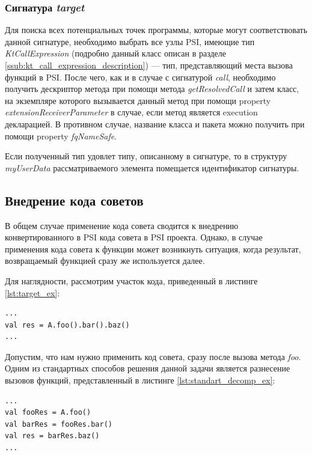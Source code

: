 \subsubsection{Сигнатура \textit{target}}
\label{ssub:target_signature}
Для поиска всех потенциальных точек программы, которые могут соответствовать
данной сигнатуре, необходимо выбрать все узлы PSI, имеющие тип
\textit{KtCallExpression} (подробно данный класс описан в разделе
\ref{ssub:kt_call_expression_description}) --- тип, представляющий места вызова
функций в PSI.
После чего, как и в случае с сигнатурой \textit{call}, необходимо получить
дескриптор метода при помощи метода \textit{getResolvedCall} и затем класс, на
экземпляре которого вызывается данный метод при помощи property
\textit{extensionReceiverParameter} в случае, если метод является execution
декларацией.
В противном случае, название класса и пакета можно получить при помощи property
\textit{fqNameSafe}.

Если полученный тип удовлет	типу, описанному в сигнатуре, то в структуру
\textit{myUserData} рассматриваемого элемента помещается идентификатор
сигнатуры.
\subsection{Внедрение кода советов}
\label{sub:advice_applying_description}
В общем случае применение кода совета сводится к внедрению конвертированного в
PSI кода совета в PSI проекта.
Однако, в случае применения кода совета к функции может возникнуть ситуация,
когда результат, возвращаемый функцией сразу же используется далее.

Для наглядности, рассмотрим участок кода, приведенный в листинге
\ref{lst:target_ex}:
\begin{lstlisting}[style={java}, label=lst:target_ex,
    caption={Пример целевой точки внедрения}]
...
val res = A.foo().bar().baz()
...
\end{lstlisting}
Допустим, что нам нужно применить код совета, сразу после вызова метода
\textit{foo}.
Одним из стандартных способов решения данной задачи является разнесение вызовов
функций, представленный в листинге \ref{lst:standart_decomp_ex}:
\begin{lstlisting}[style={java}, label=lst:standart_decomp_ex,
    caption={Пример разнесения вызовов методов}]
...
val fooRes = A.foo()
val barRes = fooRes.bar()
val res = barRes.baz()
...
\end{lstlisting}

